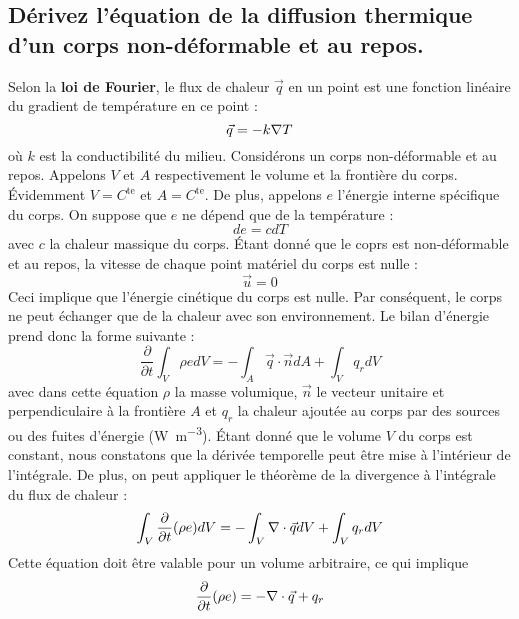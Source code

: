 \subsection{Dérivez l'équation de la diffusion thermique d'un corps non-déformable et au repos.}
Selon la \textbf{loi de Fourier}, le flux de chaleur $\vec{q}$ en un point est une fonction linéaire du gradient de température en ce point :
\begin{equation} \vec{q} = -k\nabla T \label{eq:fourier}\end{equation}
où $k$ est la conductibilité du milieu.
Considérons un corps non-déformable et au repos. Appelons $V$ et $A$ respectivement le volume et la frontière du corps. Évidemment $V=C^\text{te}$ et $A=C^\text{te}$. De plus, appelons $e$ l'énergie interne spécifique du corps. On suppose que $e$ ne dépend que de la température :
\begin{equation} de = cdT \label{eq:efonctiondeT}\end{equation}
avec $c$ la chaleur massique du corps. Étant donné que le coprs est non-déformable et au repos, la vitesse de chaque point matériel du corps est nulle :
\begin{equation} \vec{u} = 0 \label{eq:vitesse_nulle}\end{equation}
Ceci implique que l'énergie cinétique du corps est nulle. Par conséquent, le corps ne peut échanger que de la chaleur avec son environnement. Le bilan d'énergie prend donc la forme suivante :
\begin{equation} \frac{\partial}{\partial t}\int_V\rho edV = - \int_A\vec{q}\cdot\vec{n}dA + \int_Vq_rdV \end{equation}
avec dans cette équation $\rho$ la masse volumique, $\vec{n}$ le vecteur unitaire et perpendiculaire à la frontière $A$ et $q_r$ la chaleur ajoutée au corps par des sources ou des fuites d'énergie (\si{\watt\per\metre\cubed}). Étant donné que le volume $V$ du corps est constant, nous constatons que la dérivée temporelle peut être mise à l'intérieur de l'intégrale. De plus, on peut appliquer le théorème de la divergence à l'intégrale du flux de chaleur :
\begin{equation} \int_V\frac{\partial}{\partial t}(\rho e)dV = -\int_V\nabla \cdot\vec{q}dV + \int_Vq_rdV \end{equation}
Cette équation doit être valable pour un volume arbitraire, ce qui implique
\begin{equation} \frac{\partial}{\partial t}(\rho e) = -\nabla \cdot\vec{q} + q_r \end{equation}
